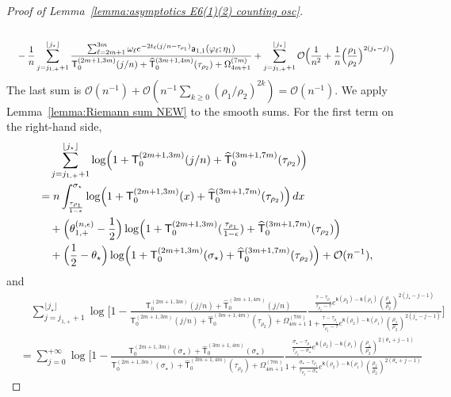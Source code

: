 \documentclass[a4paper]{article}
\numberwithin{equation}{section}
\begin{document}
\begin{proof}[Proof of Lemma~\ref{lemma:asymptotics E6(1)(2) counting osc}]
\begin{align*}
\\
&\quad
-\frac{1}{n}
\sum_{j=j_{1,+}+1}^{\lfloor j_{\star}\rfloor}
\frac{
\sum_{\ell={2m+1}}^{3m}\omega_{\ell}
e^{-2t_{\ell}(j/n-\tau_{\rho_1})}
\mathsf{a}_{1,1}(\varphi_{\ell};\eta_1)
}{\mathsf{T}_{0}^{(2m+1,3m)}(j/n)
+\widehat{\mathsf{T}}_0^{(3m+1,4m)}(\tau_{\rho_2})
+\Omega_{4m+1}^{(7m)}}
+
\sum_{j=j_{1,+}+1}^{\lfloor j_{\star}\rfloor}
\mathcal{O}\Bigl(\frac{1}{n^2}+\frac{1}{n}\Bigl(\frac{\rho_1}{\rho_2}\Bigr)^{2(j_{\star}-j)}\Bigr)
\end{align*}
The last sum is
$\mathcal O(n^{-1})+\mathcal O(n^{-1}\sum_{k\ge0}(\rho_1/\rho_2)^{2k})
=\mathcal O(n^{-1})$.  We apply
Lemma~\ref{lemma:Riemann sum NEW} to the smooth sums.  For the first term on
the right-hand side,
\begin{align*}
&\quad 
\sum_{j=j_{1,+}+1}^{\lfloor j_{\star}\rfloor}
\log\Bigl(1+\mathsf{T}_{0}^{(2m+1,3m)}(j/n)
+\widehat{\mathsf{T}}_0^{(3m+1,7m)}(\tau_{\rho_2})\Bigr)
\\
&=n\int_{\frac{\tau_{\rho_1}}{1-\epsilon}}^{\sigma_{\star}}
\log\Bigl(1+\mathsf{T}_{0}^{(2m+1,3m)}(x)+\widehat{\mathsf{T}}_0^{(3m+1,7m)}(\tau_{\rho_2})\Bigr)\,dx
\\
&\quad 
+\Bigl(\theta_{1,+}^{(n,\epsilon)}-\frac{1}{2}\Bigr)
\log\Bigl(1+\mathsf{T}_{0}^{(2m+1,3m)}(\tfrac{\tau_{\rho_1}}{1-\epsilon})+\widehat{\mathsf{T}}_0^{(3m+1,7m)}(\tau_{\rho_2})\Bigr)
\\
&\quad 
+\Bigl(\frac{1}{2}-\theta_{\star}\Bigr)
\log\Bigl(1+\mathsf{T}_{0}^{(2m+1,3m)}(\sigma_{\star})+\widehat{\mathsf{T}}_0^{(3m+1,7m)}(\tau_{\rho_2})\Bigr)
+\mathcal{O}(n^{-1}), 
\end{align*}
and 
\begin{align*}
  &\quad 
\sum_{j=j_{1,+}+1}^{\lfloor j_{\star}\rfloor}
\log\bigg[
1-\frac{\mathsf{T}_{0}^{(2m+1,3m)}(j/n)+\widehat{\mathsf{T}}_0^{(3m+1,4m)}(j/n)}{\mathsf{T}_{0}^{(2m+1,3m)}(j/n)
+\widehat{\mathsf{T}}_0^{(3m+1,4m)}(\tau_{\rho_2})
+\Omega_{4m+1}^{(7m)}}
\frac{\frac{\tau-\tau_{\rho_1}}{\tau_{\rho_2}-\tau}e^{\mathsf{k}(\rho_2)-\mathsf{k}(\rho_1)}(\tfrac{\rho_1}{\rho_2})^{2(j_{\star}-j-1)}}{1+\frac{\tau-\tau_{\rho_1}}{\tau_{\rho_2}-\tau}e^{\mathsf{k}(\rho_2)-\mathsf{k}(\rho_1)}(\tfrac{\rho_1}{\rho_2})^{2(j_{\star}-j-1)}}
\bigg]
\\
&=
\sum_{j=0}^{+\infty}
\log\bigg[
1-\frac{\mathsf{T}_{0}^{(2m+1,3m)}(\sigma_{\star})+\widehat{\mathsf{T}}_0^{(3m+1,4m)}(\sigma_{\star})}{\mathsf{T}_{0}^{(2m+1,3m)}(\sigma_{\star})
+\widehat{\mathsf{T}}_0^{(3m+1,4m)}(\tau_{\rho_2})
+\Omega_{4m+1}^{(7m)}}
\frac{\frac{\sigma_{\star}-\tau_{\rho_1}}{\tau_{\rho_2}-\sigma_{\star}}e^{\mathsf{k}(\rho_2)-\mathsf{k}(\rho_1)}(\tfrac{\rho_1}{\rho_2})^{2(\theta_{\star}+j-1)}}{1+\frac{\sigma_{\star}-\tau_{\rho_1}}{\tau_{\rho_2}-\sigma_{\star}}e^{\mathsf{k}(\rho_2)-\mathsf{k}(\rho_1)}(\tfrac{\rho_1}{\rho_2})^{2(\theta_{\star}+j-1)}}

\end{align*}
\end{proof}
\end{document}
